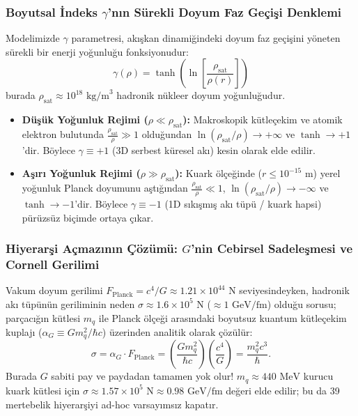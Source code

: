 \subsubsection{Boyutsal İndeks $\gamma$'nın Sürekli Doyum Faz Geçişi Denklemi}
\label{sec:surekli_gamma}
Modelimizde $\gamma$ parametresi, akışkan dinamiğindeki doyum faz geçişini yöneten sürekli bir enerji yoğunluğu fonksiyonudur:
\begin{equation}
    \gamma(\rho) = \tanh\left( \ln\left[ \frac{\rho_{\mathrm{sat}}}{\rho(r)} \right] \right)
    \label{eq:gamma_surekli_gecis}
\end{equation}
burada $\rho_{\mathrm{sat}} \approx 10^{18}\text{ kg/m}^3$ hadronik nükleer doyum yoğunluğudur.
\begin{itemize}
    \item \textbf{Düşük Yoğunluk Rejimi ($\rho \ll \rho_{\mathrm{sat}}$):} Makroskopik kütleçekim ve atomik elektron bulutunda $\frac{\rho_{\mathrm{sat}}}{\rho} \gg 1$ olduğundan $\ln(\rho_{\mathrm{sat}}/\rho) \to +\infty$ ve $\tanh \to +1$'dir. Böylece $\gamma \equiv +1$ (3D serbest küresel akı) kesin olarak elde edilir.
    \item \textbf{Aşırı Yoğunluk Rejimi ($\rho \gg \rho_{\mathrm{sat}}$):} Kuark ölçeğinde ($r \le 10^{-15}\text{ m}$) yerel yoğunluk Planck doyumunu aştığından $\frac{\rho_{\mathrm{sat}}}{\rho} \ll 1$, $\ln(\rho_{\mathrm{sat}}/\rho) \to -\infty$ ve $\tanh \to -1$'dir. Böylece $\gamma \equiv -1$ (1D sıkışmış akı tüpü / kuark hapsi) pürüzsüz biçimde ortaya çıkar.
\end{itemize}

\subsubsection{Hiyerarşi Açmazının Çözümü: $G$'nin Cebirsel Sadeleşmesi ve Cornell Gerilimi}
\label{sec:hiyerarsi_monograph}
Vakum doyum gerilimi $F_{\mathrm{Planck}} = c^4/G \approx 1.21 \times 10^{44}\text{ N}$ seviyesindeyken, hadronik akı tüpünün geriliminin neden $\sigma \approx 1.6 \times 10^5\text{ N}$ ($\approx 1\text{ GeV/fm}$) olduğu sorusu; parçacığın kütlesi $m_q$ ile Planck ölçeği arasındaki boyutsuz kuantum kütleçekim kuplajı ($\alpha_G \equiv G m_q^2 / \hbar c$) üzerinden analitik olarak çözülür:
\begin{equation}
    \sigma = \alpha_G \cdot F_{\mathrm{Planck}} = \left( \frac{G m_q^2}{\hbar c} \right) \left( \frac{c^4}{G} \right) = \frac{m_q^2 c^3}{\hbar}.
    \label{eq:sigma_monograph_ispat}
\end{equation}
Burada $G$ sabiti pay ve paydadan tamamen yok olur! $m_q \approx 440\text{ MeV}$ kurucu kuark kütlesi için $\sigma \approx 1.57 \times 10^5\text{ N} \approx 0.98\text{ GeV/fm}$ değeri elde edilir; bu da 39 mertebelik hiyerarşiyi ad-hoc varsayımsız kapatır.

